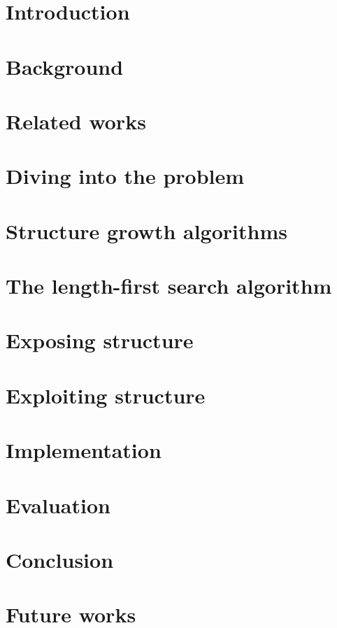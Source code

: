 \documentclass[titlepage,a4]{report}
\begin{document}




\tableofcontents

\chapter{Introduction}


\chapter{Background}


\chapter{Related works}


\chapter{Diving into the problem}


\chapter{Structure growth algorithms}


\chapter{The length-first search algorithm}


\chapter{Exposing structure}


\chapter{Exploiting structure}


\chapter{Implementation}


\chapter{Evaluation}


\chapter{Conclusion}


\chapter{Future works}



\nocite{*} %


\end{document}
